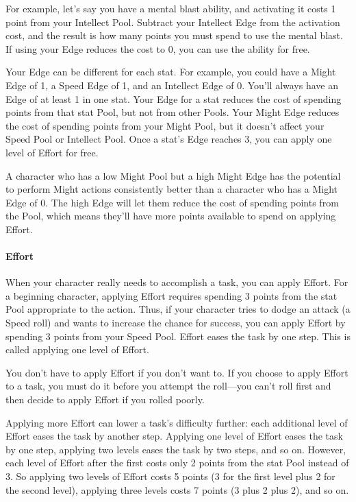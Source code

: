 \begin{multicols}{2}
For example, let’s say you have a mental blast ability, and activating it costs 1 point from your Intellect Pool. Subtract your Intellect Edge from the activation cost, and the result is how many points you must spend to use the mental blast. If using your Edge reduces the cost to 0, you can use the ability for free.

Your Edge can be different for each stat. For example, you could have a Might Edge of 1, a Speed Edge of 1, and an Intellect Edge of 0. You’ll always have an Edge of at least 1 in one stat. Your Edge for a stat reduces the cost of spending points from that stat Pool, but not from other Pools. Your Might Edge reduces the cost of spending points from your Might Pool, but it doesn’t affect your Speed Pool or Intellect Pool. Once a stat’s Edge reaches 3, you can apply one level of Effort for free.

A character who has a low Might Pool but a high Might Edge has the potential to perform Might actions consistently better than a character who has a Might Edge of 0. The high Edge will let them reduce the cost of spending points from the Pool, which means they’ll have more points available to spend on applying Effort.

\paragraph{Effort}

When your character really needs to accomplish a task, you can apply Effort. For a beginning character, applying Effort requires spending 3 points from the stat Pool appropriate to the action. Thus, if your character tries to dodge an attack (a Speed roll) and wants to increase the chance for success, you can apply Effort by spending 3 points from your Speed Pool. Effort eases the task by one step. This is called applying one level of Effort.

You don’t have to apply Effort if you don’t want to. If you choose to apply Effort to a task, you must do it before you attempt the roll—you can’t roll first and then decide to apply Effort if you rolled poorly.

Applying more Effort can lower a task’s difficulty further: each additional level of Effort eases the task by another step. Applying one level of Effort eases the task by one step, applying two levels eases the task by two steps, and so on. However, each level of Effort after the first costs only 2 points from the stat Pool instead of 3. So applying two levels of Effort costs 5 points (3 for the first level plus 2 for the second level), applying three levels costs 7 points (3 plus 2 plus 2), and so on.


\end{multicols}
